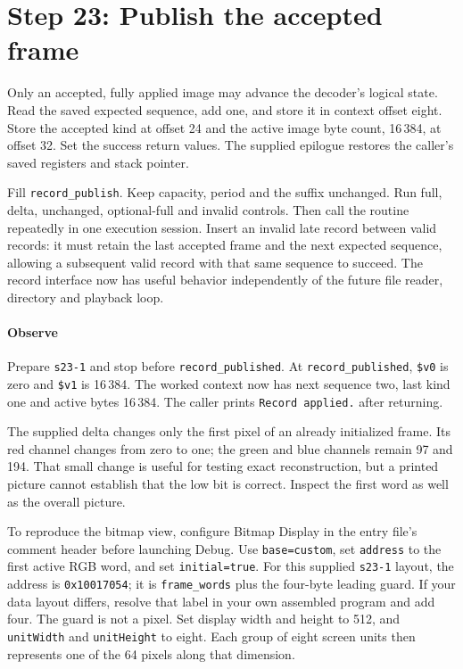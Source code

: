\section{Step 23: Publish the accepted frame}
Only an accepted, fully applied image may advance the decoder's logical
state. Read the saved expected sequence, add one, and store it in context offset
eight. Store the accepted kind at offset 24 and the active image byte count,
16\,384, at offset 32. Set the success return values. The supplied epilogue
restores the caller's saved registers and stack pointer.

Fill \texttt{record\_publish}. Keep capacity, period and the suffix unchanged.
Run full, delta, unchanged, optional-full and invalid controls. Then call the
routine repeatedly in one execution session. Insert an invalid late record
between valid records: it must retain the last accepted frame and the next
expected sequence, allowing a subsequent valid record with that same sequence
to succeed. The record interface now has useful behavior independently of the
future file reader, directory and playback loop.

\paragraph{Observe} Prepare \texttt{s23-1} and stop before
\texttt{record\_published}. At \texttt{record\_published}, \texttt{\$v0} is zero and
\texttt{\$v1} is 16\,384. The worked context now has next sequence two,
last kind one and active bytes 16\,384. The caller prints
\texttt{Record applied.} after returning.

The supplied delta changes only the first pixel of an already initialized
frame. Its red channel changes from zero to one; the green and blue channels
remain 97 and 194. That small change is useful for testing exact reconstruction,
but a printed picture cannot establish that the low bit is correct. Inspect the
first word as well as the overall picture.

To reproduce the bitmap view, configure Bitmap Display in the entry file's
comment header before launching Debug. Use \texttt{base=custom}, set
\texttt{address} to the first active RGB word, and set \texttt{initial=true}.
For this supplied \texttt{s23-1} layout, the address is \texttt{0x10017054};
it is \texttt{frame\_words} plus the four-byte leading guard. If your data
layout differs, resolve that label in your own assembled program and add four.
The guard is not a pixel. Set display width and height to 512, and
\texttt{unitWidth} and \texttt{unitHeight} to eight. Each group of eight
screen units then represents one of the 64 pixels along that dimension.


